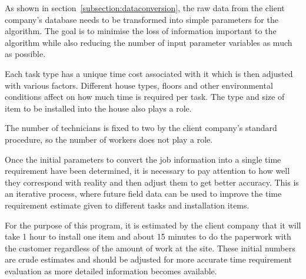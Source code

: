As shown in section~\ref{subsection:dataconversion}, the raw data from the client company's database needs to be transformed into simple parameters for the algorithm. The goal is to minimise the loss of information important to the algorithm while also reducing the number of input parameter variables as much as possible.  

Each task type has a unique time cost associated with it which is then adjusted with various factors. Different house types, floors and other environmental conditions affect on how much time is required per task. The type and size of item to be installed into the house also plays a role. 

The number of technicians is fixed to two by the client company's standard procedure, so the number of workers does not play a role.  

Once the initial parameters to convert the job information into a single time requirement have been determined, it is necessary to pay attention to how well they correspond with reality and then adjust them to get better accuracy. This is an iterative process, where future field data can be used to improve the time requirement estimate given to different tasks and installation items.

For the purpose of this program, it is estimated by the client company that it will take 1 hour to install one item and about 15 minutes to do the paperwork with the customer regardless of the amount of work at the site. These initial numbers are crude estimates and should be adjusted for more accurate time requirement evaluation as more detailed information becomes available.
    




